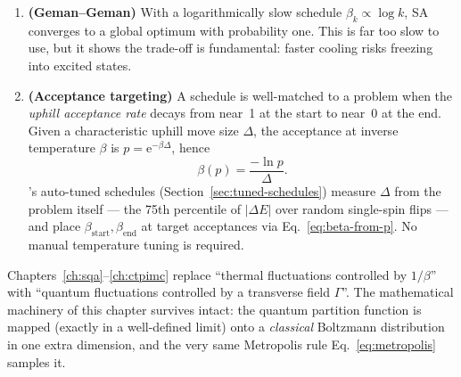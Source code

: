 \begin{enumerate}
\item \textbf{(Geman--Geman)} With a logarithmically slow schedule
$\beta_k \propto \log k$, SA converges to a global optimum with probability
one. This is far too slow to use, but it shows the trade-off is fundamental:
faster cooling risks freezing into excited states.
\item \textbf{(Acceptance targeting)} A schedule is well-matched to a problem
when the \emph{uphill acceptance rate} decays from near~1 at the start to
near~0 at the end. Given a characteristic uphill move size $\Delta$, the
acceptance at inverse temperature $\beta$ is
$p=\mathrm{e}^{-\beta\Delta}$, hence
\begin{equation}
\beta(p)=\frac{-\ln p}{\Delta}.
\label{eq:beta-from-p}
\end{equation}
\qv's auto-tuned schedules (Section~\ref{sec:tuned-schedules}) measure
$\Delta$ from the problem itself --- the 75th percentile of $|\Delta E|$ over
random single-spin flips --- and place $\beta_{\text{start}},
\beta_{\text{end}}$ at target acceptances via Eq.~\eqref{eq:beta-from-p}.
No manual temperature tuning is required.
\end{enumerate}

\begin{notebox}
Chapters~\ref{ch:sqa}--\ref{ch:ctpimc} replace ``thermal fluctuations
controlled by $1/\beta$'' with ``quantum fluctuations controlled by a
transverse field $\Gamma$''. The mathematical machinery of this chapter
survives intact: the quantum partition function is mapped (exactly in a
well-defined limit) onto a \emph{classical} Boltzmann distribution in one
extra dimension, and the very same Metropolis rule
Eq.~\eqref{eq:metropolis} samples it.
\end{notebox}
